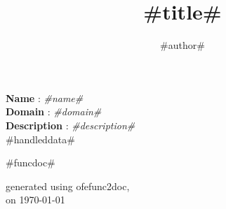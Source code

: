 \documentclass[a4paper,10pt]{article}
\title{#title#}
\author{#author#}
\date{}
\begin{document}
\maketitle

\noindent \textbf{Name} : \textit{#name#}\\
\noindent \textbf{Domain} : \textit{#domain#}\\
\noindent \textbf{Description} : \textit{#description#}\\

#handleddata#

\bigskip
\bigskip

\begin{multicols}{2}

#funcdoc#

\end{multicols}

\bigskip
\bigskip
\small
\begin{flushright}generated using ofefunc2doc,\\
on \today\end{flushright}
\small
\end{document}
